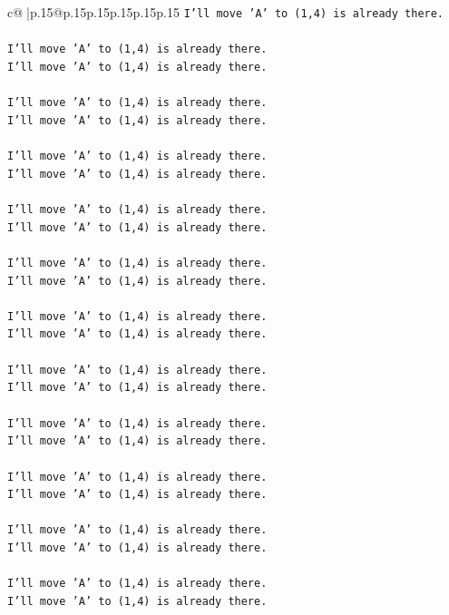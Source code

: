 \documentclass{article}
\begin{document}
{\begin{supertabular}{c@{$\;$}|p{.15\linewidth}@{}p{.15\linewidth}p{.15\linewidth}p{.15\linewidth}p{.15\linewidth}p{.15\linewidth}}
{{{\texttt{I'll move 'A' to (1,4) is already there.} \\
\\ 
\texttt{I'll move 'A' to (1,4) is already there.} \\
\texttt{I'll move 'A' to (1,4) is already there.} \\
\\ 
\texttt{I'll move 'A' to (1,4) is already there.} \\
\texttt{I'll move 'A' to (1,4) is already there.} \\
\\ 
\texttt{I'll move 'A' to (1,4) is already there.} \\
\texttt{I'll move 'A' to (1,4) is already there.} \\
\\ 
\texttt{I'll move 'A' to (1,4) is already there.} \\
\texttt{I'll move 'A' to (1,4) is already there.} \\
\\ 
\texttt{I'll move 'A' to (1,4) is already there.} \\
\texttt{I'll move 'A' to (1,4) is already there.} \\
\\ 
\texttt{I'll move 'A' to (1,4) is already there.} \\
\texttt{I'll move 'A' to (1,4) is already there.} \\
\\ 
\texttt{I'll move 'A' to (1,4) is already there.} \\
\texttt{I'll move 'A' to (1,4) is already there.} \\
\\ 
\texttt{I'll move 'A' to (1,4) is already there.} \\
\texttt{I'll move 'A' to (1,4) is already there.} \\
\\ 
\texttt{I'll move 'A' to (1,4) is already there.} \\
\texttt{I'll move 'A' to (1,4) is already there.} \\
\\ 
\texttt{I'll move 'A' to (1,4) is already there.} \\
\texttt{I'll move 'A' to (1,4) is already there.} \\
\\ 
\texttt{I'll move 'A' to (1,4) is already there.} \\
\texttt{I'll move 'A' to (1,4) is already there.} \\
}}}
\end{supertabular}}
\end{document}
